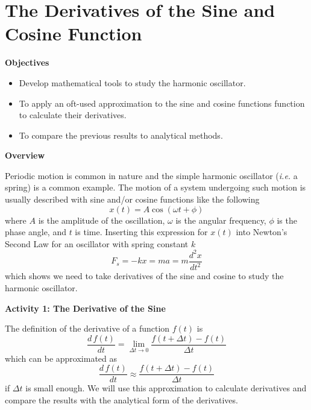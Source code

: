 
\section{The Derivatives of the Sine and Cosine Function}

\makelabheader %

\bigskip
\textbf{Objectives }

\begin{itemize}[nosep]
\item Develop mathematical tools to study the harmonic oscillator.
\item To apply an oft-used approximation to the sine and cosine functions function to calculate their derivatives.
\item To compare the previous results to analytical methods.
\end{itemize}

\medskip
\textbf{Overview }

Periodic motion is common in nature and the simple harmonic oscillator ({\it i.e.} a spring) is
a common example.
The motion of a system undergoing such motion is usually described with sine
and/or cosine functions like the following
\begin{equation}
x(t) = A\cos(\omega t + \phi)
\end{equation}
where $A$ is the amplitude of the oscillation, $\omega$ is the angular frequency, $\phi$ is the
phase angle, and $t$ is time.
Inserting this expression for $x(t)$ into Newton's Second Law for an oscillator
with spring constant $k$
\begin{equation}
F_s = -kx = ma = m\frac{d^2x}{dt^2}
\end{equation}
which shows we need to take derivatives of the sine and cosine to study the harmonic oscillator.

\textbf{Activity 1: The Derivative of the Sine} 

The definition of the derivative of a function $f(t)$ is 
\begin{equation}
\frac{d \, f \! (t)}{dt} = \lim_{\Delta t \rightarrow 0} \frac{f(t+\Delta t) - f(t)}{\Delta t}
\end{equation}
which can be approximated as
\begin{equation}
\frac{d \, f \! (t)}{dt} \approx \frac{f(t+\Delta t) - f(t)}{\Delta t}
\label{eq:approx}
\end{equation}
if $\Delta t$ is small enough.
We will use this approximation to calculate derivatives and compare the results
with the analytical form of the derivatives.

